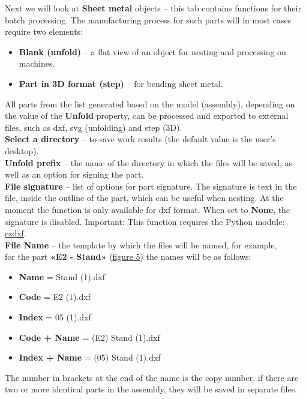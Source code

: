 \documentclass[a4paper,12pt]{article}
\begin{document}
Next we will look at \textbf{Sheet metal} objects -- this tab contains functions for their batch processing. The manufacturing process for such parts will in most cases require two elements:
\begin{itemize}
	\item \textbf{Blank (unfold)} -- a flat view of an object for nesting and processing on machines.
	\item \textbf{Part in 3D format (step)} -- for bending sheet metal.\\
\end{itemize}

All parts from the list generated based on the model (assembly), depending on the value of the \textbf{Unfold} property, can be processed and exported to external files, such as dxf, svg (unfolding) and step (3D).\\

\textbf{Select a directory} -- to save work results (the default value is the user's desktop).\\

\textbf{Unfold prefix} -- the name of the directory in which the files will be saved, as well as an option for signing the part.\\

\textbf{File signature} -- list of options for part signature. The signature is text in the file, inside the outline of the part, which can be useful when nesting. At the moment the function is only available for dxf format. When set to \textbf{None}, the signature is disabled. Important: This function requires the Python module: \href{https://pypi.org/project/ezdxf}{ezdxf}.\\

\textbf{File Name} -- the template by which the files will be named, for example,\\for the part \textbf{«E2 - Stand»} (\hyperref[sec:properties]{figure 5}) the names will be as follows:
\begin{itemize}
	\item \textbf{Name} = Stand (1).dxf
	\item \textbf{Code} = E2 (1).dxf
	\item \textbf{Index} = 05 (1).dxf
	\item \textbf{Code + Name} = (E2) Stand (1).dxf
	\item \textbf{Index + Name} = (05) Stand (1).dxf
\end{itemize}

The number in brackets at the end of the name is the copy number, if there are two or more identical parts in the assembly, they will be saved in separate files.\\
\end{document}
